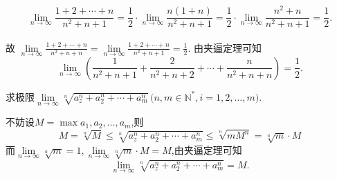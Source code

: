\[
\lim\limits_{n \to \infty}\frac{1+2+\cdots +n}{n^2+n+1}=\frac 12 \cdot \lim\limits_{n \to \infty}\frac{n(1+n)}{n^2+n+1}=\frac 12 \cdot \lim\limits_{n \to \infty}\frac{n^2+n}{n^2+n+1}=\frac{1}{2}.
\]
\\
故
$
\displaystyle \lim\limits_{n \to \infty}\frac{1+2+\cdots +n}{n^2+n+n}=\lim\limits_{n \to \infty}\frac{1+2+\cdots +n}{n^2+n+1}=\frac 12.
$
由夹逼定理可知
\[
\lim\limits_{n \to \infty}\left(\frac{1}{n^2+n+1}+\frac{2}{n^2+n+2}+\cdots+\frac{n}{n^2+n+n}\right)=\frac 12.
\]

\vspace*{-2em}

\examples 求极限$\lim\limits_{n \to \infty}\sqrt[n]{a_z^n+a_2^n+\cdots+a_m^n}\,\big(n,m \in \mathbb{N}^*,i=1,2,\ldots,m \big)$.

\solve 不妨设$M=\max{a_1,a_2,\ldots,a_m}$,则
\[
M=\sqrt[n]{M}\le \sqrt[n]{a_z^n+a_2^n+\cdots+a_m^n} \le \sqrt[n]{mM^n}=\sqrt[n]{m}\cdot M
\]
而$\lim\limits_{n \to \infty}\sqrt[n]{m}=1,\lim\limits_{n \to \infty }\sqrt[n]{m}\cdot M=M$,由夹逼定理可知
\[
\lim\limits_{n \to \infty}\sqrt[n]{a_z^n+a_2^n+\cdots+a_m^n}=M.
\]

